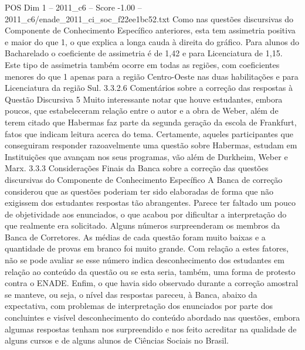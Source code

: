 \begin{textsample}{POS Dim 1 – 2011\_c6 – Score -1.00 – 2011\_c6/enade\_2011\_ci\_soc\_f22ee1bc52.txt}
Como nas questões discursivas do Componente de Conhecimento Específico anteriores, esta tem assimetria positiva e maior do que 1, o que explica a longa cauda à direita do gráfico.
Para alunos do Bacharelado o coeficiente de assimetria é de 1,42 e para Licenciatura de 1,15.
Este tipo de assimetria também ocorre em todas as regiões, com coeficientes menores do que 1 apenas para a região Centro-Oeste nas duas habilitações e para Licenciatura da região Sul. 3.3.2.6 Comentários sobre a correção das respostas à Questão Discursiva 5 Muito interessante notar que houve estudantes, embora poucos, que estabeleceram relação entre o autor e a obra de Weber, além de terem citado que Habermas faz parte da segunda geração da escola de Frankfurt, fatos que indicam leitura acerca do tema.
Certamente, aqueles participantes que conseguiram responder razoavelmente uma questão sobre Habermas, estudam em Instituições que avançam nos seus programas, vão além de Durkheim, Weber e Marx. 3.3.3 Considerações Finais da Banca sobre a correção das questões discursivas do Componente de Conhecimento Específico A Banca de correção considerou que as questões poderiam ter sido elaboradas de forma que não exigissem dos estudantes respostas tão abrangentes.
Parece ter faltado um pouco de objetividade aos enunciados, o que acabou por dificultar a interpretação do que realmente era solicitado.
Alguns números surpreenderam os membros da Banca de Corretores.
As médias de cada questão foram muito baixas e a quantidade de provas em branco foi muito grande.
Com relação a estes fatores, não se pode avaliar se esse número indica desconhecimento dos estudantes em relação ao conteúdo da questão ou se esta seria, também, uma forma de protesto contra o ENADE.
Enfim, o que havia sido observado durante a correção amostral se manteve, ou seja, o nível das respostas pareceu, à Banca, abaixo da expectativa, com problemas de interpretação dos enunciados por parte dos concluintes e visível desconhecimento do conteúdo abordado nas questões, embora algumas respostas tenham nos surpreendido e nos feito acreditar na qualidade de alguns cursos e de alguns alunos de Ciências Sociais no Brasil.

\end{textsample}

